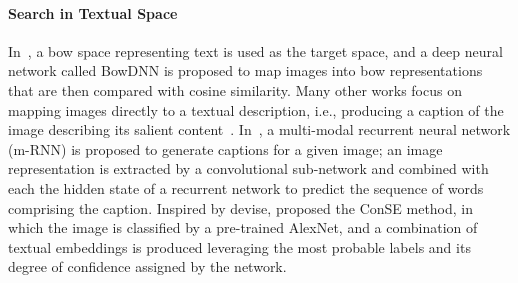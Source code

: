\paragraph{Search in Textual Space}
In~\cite{bai2014bag}, a \acrfull{bow} space representing text is used as the target space, and a deep neural network called BowDNN is proposed to map images into \gls{bow} representations that are then compared with cosine similarity.
Many other works focus on mapping images directly to a textual description, i.e., producing a caption of the image describing its salient content~\cite{vinyals2015show,karpathy2015deep,fang2015captions}.
In~\cite{mao2014deep}, a multi-modal recurrent neural network (m-RNN) is proposed to generate captions for a given image;
an image representation is extracted by a convolutional sub-network and combined with each the hidden state of a recurrent network to predict the sequence of words comprising the caption.
Inspired by \gls{devise}, \citet{norouzi2013zero} proposed the ConSE method, in which the image is classified by a pre-trained AlexNet, and a combination of textual embeddings is produced leveraging the most probable labels and its degree of confidence assigned by the network.

